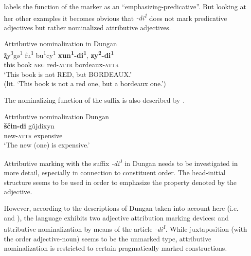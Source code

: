 \citet[82]{zevachina2001} labels the function of the marker as an “emphasizing\hyp{}predicative”. But looking at her other examples it becomes obvious that \textit{-di\textsuperscript{1}} does not mark predicative adjectives but rather nominalized attributive adjectives.
\begin{exe}
\ex \rm{Attributive nominalization in Dungan \citep[82]{zevachina2001}}\\
\gll	ž̨y\textsuperscript{3}gə\textsuperscript{1} fu\textsuperscript{1} bu\textsuperscript{1}cy\textsuperscript{1} \textbf{xun\textsuperscript{1}-di\textsuperscript{1}}, \textbf{zy\textsuperscript{2}-di\textsuperscript{1}}\\
	this book \textsc{neg} red-\textsc{attr} bordeaux-\textsc{attr}\\
\glt	‘This book is not RED, but BORDEAUX.’\\
	(lit. ‘This book is not a red one, but a bordeaux one.’)
\end{exe}
The nominalizing function of the suffix is also described by \cite{kalimov1968}.
\begin{exe}
\ex \rm{Attributive nominalization Dungan \citep[484]{kalimov1968}}\\ \label{dungan nmlz}
\gll	\textbf{ščin-di} gǔjdixyn\\
	new-\textsc{attr} expensive\\
\glt	‘The new (one) is expensive.’
\end{exe}
Attributive marking with the suffix \textit{-di\textsuperscript{1}} in Dungan needs to be investigated in more detail, especially in connection to constituent order. The head-initial structure seems to be used in order to emphasize the property denoted by the adjective.

However, according to the descriptions of Dungan taken into account here (i.e.~\citealt{kalimov1968} and \citealt{zevachina2001}), the language exhibits two adjective attribution marking devices:  and attributive nominalization by means of the article \textit{-di\textsuperscript{1}}. While juxtaposition (with the order adjective-noun) seems to be the unmarked type, attributive nominalization is restricted to certain pragmatically marked constructions.

